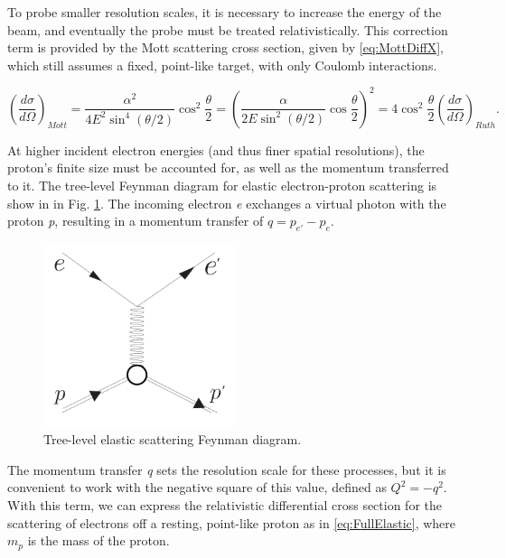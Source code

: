         To probe smaller resolution scales, it is necessary to increase the energy of the beam, and eventually the probe must be treated relativistically. This correction term is provided by the Mott scattering cross section, given by \eqref{eq:MottDiffX}, which still assumes a fixed, point-like target, with only Coulomb interactions.
            
                \begin{equation}\label{eq:MottDiffX}
                     (\frac{d\sigma}{d\Omega})_{Mott} = \frac{\alpha^2}{4E^2\sin^4{(\theta/2)}}\cos^2{\frac{\theta}{2}} = \left( \frac{\alpha}{2E\sin^2{(\theta/2)}}\cos{\frac{\theta}{2}} \right)^2 = 4\cos^2{\frac{\theta}{2}}(\frac{d\sigma}{d\Omega})_{Ruth}.
                \end{equation}
        
    
 
         At higher incident electron energies (and thus finer spatial resolutions), the proton's finite size must be accounted for, as well as the momentum transferred to it. The tree-level Feynman diagram for elastic electron-proton scattering is show in in Fig. \ref{fig:feynmanElastic}. The incoming electron \textit{e} exchanges a virtual photon with the proton \textit{p}, resulting in a momentum transfer of $q = p_{e'} - p_{e}$. 
         
        \begin{figure}[H]
            \centering
            \includegraphics[width=0.5\textwidth]{Chapters/Ch1-Intro/Ch1-Sec1-Background/pics/elastic_feynamn.png}
            \caption{Tree-level elastic scattering Feynman diagram.}
            \label{fig:feynmanElastic}
        \end{figure}

        The momentum transfer \textit{q} sets the resolution scale for these processes, but it is convenient to work with the negative square of this value, defined as $Q^2 = -q^2$. With this term, we can express the relativistic differential cross section for the scattering of electrons off a resting, point-like proton as in \eqref{eq:FullElastic}, where $m_p$ is the mass of the proton. 

